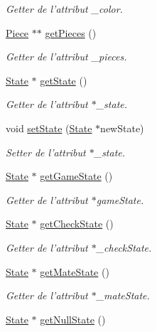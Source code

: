 \begin{DoxyCompactItemize}
\begin{DoxyCompactList}\small\item\em Getter de l'attribut \-\_\-color. \end{DoxyCompactList}\item 
\hyperlink{class_piece}{Piece} $\ast$$\ast$ \hyperlink{class_player_a738451fc076901ecf28cae81c7604e2a}{get\-Pieces} ()
\begin{DoxyCompactList}\small\item\em Getter de l'attribut \-\_\-pieces. \end{DoxyCompactList}\item 
\hyperlink{class_state}{State} $\ast$ \hyperlink{class_player_a1b85aeef66cdbc472caf951d25796086}{get\-State} ()
\begin{DoxyCompactList}\small\item\em Getter de l'attribut $\ast$\-\_\-state. \end{DoxyCompactList}\item 
void \hyperlink{class_player_a02d8b0f8340dc5557a01b33c4254757a}{set\-State} (\hyperlink{class_state}{State} $\ast$new\-State)
\begin{DoxyCompactList}\small\item\em Setter de l'attribut $\ast$\-\_\-state. \end{DoxyCompactList}\item 
\hyperlink{class_state}{State} $\ast$ \hyperlink{class_player_a98676a7d1647ac6db50507850fab1d92}{get\-Game\-State} ()
\begin{DoxyCompactList}\small\item\em Getter de l'attribut $\ast$game\-State. \end{DoxyCompactList}\item 
\hyperlink{class_state}{State} $\ast$ \hyperlink{class_player_a24f6a87b0480786ba2f966bc88d15195}{get\-Check\-State} ()
\begin{DoxyCompactList}\small\item\em Getter de l'attribut $\ast$\-\_\-check\-State. \end{DoxyCompactList}\item 
\hyperlink{class_state}{State} $\ast$ \hyperlink{class_player_abd42a23982b38a78bf66fe627d73b4cc}{get\-Mate\-State} ()
\begin{DoxyCompactList}\small\item\em Getter de l'attribut $\ast$\-\_\-mate\-State. \end{DoxyCompactList}\item 
\hyperlink{class_state}{State} $\ast$ \hyperlink{class_player_a121812f4c5a5e913f31187b90f378aa7}{get\-Null\-State} ()
$$
\end{DoxyCompactItemize}
